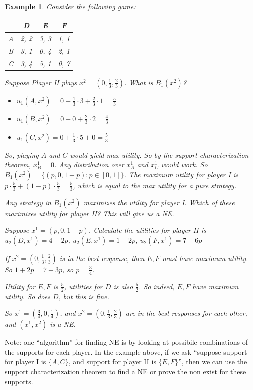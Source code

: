 \documentclass[twoside]{article}
\newtheorem{protoexample}[prototheorem]{Example}
\newenvironment{example}
{\colorlet{shadecolor}{red!15}\begin{shaded}\begin{protoexample}\normalfont}
		{\end{protoexample}\end{shaded}}
\begin{document}
\begin{example}
	Consider the following game: 
	\begin{center}
		\begin{tabular}{|c|c|c|c|}
			\hline
			  & D    & E    & F    \\
			\hline
			A & 2, 2 & 3, 3 & 1, 1 \\
			\hline
			B & 3, 1 & 0, 4 & 2, 1 \\
			\hline
			C & 3, 4 & 5, 1 & 0, 7 \\
			\hline
		\end{tabular}
	\end{center}
	Suppose Player II plays $x^2 = (0, \frac{1}{3}, \frac{2}{3})$. What is $B_1(x^2)$? \begin{itemize}
	\item $u_1(A, x^2) = 0 + \frac{1}{3} \cdot 3 + \frac{2}{3} \cdot 1 = \frac{5}{3}$
	\item $u_1(B, x^2) = 0 + 0 + \frac{2}{3} \cdot 2 = \frac{4}{3}$
	\item $u_1(C, x^2) = 0 + \frac{1}{3} \cdot 5 + 0 = \frac{5}{3}$
	\end{itemize}
	So, playing $A$ and $C$ would yield max utility. So by the support characterization theorem, $x_B^1 = 0$. Any distribution over $x_A^1$ and $x_C^1$ would work. So $B_1(x^2) = \{(p, 0, 1-p) : p \in [0, 1]\}$. The maximum utility for player I is $p \cdot \frac{5}{3} + (1-p) \cdot \frac{5}{3} = \frac{5}{3}$, which is equal to the max utility for a pure strategy. 
	
	Any strategy in $B_1(x^2)$ maximizes the utility for player I. Which of these maximizes utility for player II? This will give us a NE. 
	
	Suppose $x^1 = (p, 0, 1-p)$. Calculate the utilities for player II is $u_2(D, x^1) = 4-2p$, $u_2(E, x^1) = 1+2p$, $u_2(F, x^1) = 7-6p$
	
	If $x^2 = (0, \frac{1}{3}, \frac{2}{3})$ is in the best response, then $E, F$ must have maximum utility. So $1+2p = 7-3p$, so $p = \frac{3}{4}$. 
	
	Utility for $E, F$ is $\frac{5}{2}$, utilities for $D$ is also $\frac{5}{2}$. So indeed, $E, F$ have maximum utility. So does $D$, but this is fine. 
	
	So $x^1 = (\frac{3}{4}, 0, \frac{1}{4})$, and $x^2 = (0, \frac{1}{3}, \frac{2}{3})$ are in the best responses for each other, and $(x^1, x^2)$ is a NE. 
\end{example}

Note: one ``algorithm'' for finding NE is by looking at possibile combinations of the supports for each player. In the example above, if we ask ``suppose support for player I is $\{A, C\}$, and support for player II is $\{E, F\}$'', then we can use the support characterization theorem to find a NE or prove the non exist for these supports. 
\end{document}
